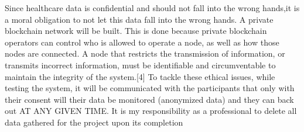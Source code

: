 Since healthcare data is confidential and should not fall into the wrong hands,it is a moral obligation to not let this data fall into the wrong hands. A private blockchain network will be built. This is done because private blockchain operators can control who is allowed to operate a node, as well as how those nodes are connected. A node that restricts the transmission of information, or transmits incorrect information, must be identifiable and circumventable to maintain the integrity of the system.[4] To tackle these ethical issues, while testing the system, it will be communicated with the participants that only with their consent will their data be monitored (anonymized data) and they can back out AT ANY GIVEN TIME. It is my responsibility as a professional to delete all data gathered for the project upon its completion






